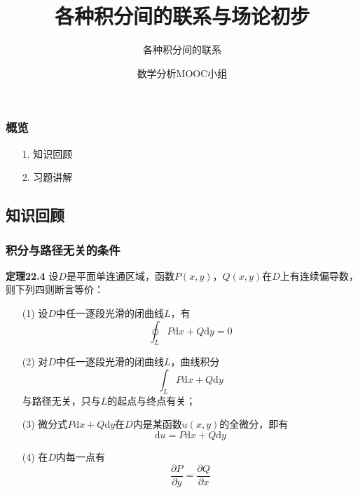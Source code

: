 \documentclass[xetex]{beamer}
\begin{document}
	\begin{frame}
		\title{各种积分间的联系与场论初步}
		\subtitle{各种积分间的联系}
		\author{数学分析MOOC小组}
		\date{  }
		\titlepage
	\end{frame}
	
	\begin{frame}
		\frametitle{概览}
		\begin{itemize}
			\item[1.] 知识回顾		
			\item[2.] 习题讲解
		\end{itemize}
	\end{frame}
	
	\begin{frame}
		\section{知识回顾}
	\end{frame}
	
	\begin{frame}
		\frametitle{积分与路径无关的条件}
		\textbf{定理22.4}
			设$D$是平面单连通区域，函数$P(x, y)$，$Q(x, y)$在$D$上有连续偏导数，则下列四则断言等价：
			\begin{itemize}
				\item[(1)] 设$D$中任一逐段光滑的闭曲线$L$，有
					\begin{equation*}
						\oint_L P\mathrm{d}x + Q\mathrm{d}y = 0
					\end{equation*}
				\item[(2)]对$D$中任一逐段光滑的闭曲线$L$，曲线积分
					\begin{equation*}
						\int_L P\mathrm{d}x + Q\mathrm{d}y
					\end{equation*}
					与路径无关，只与$L$的起点与终点有关；
				\item[(3)]微分式$P\mathrm{d}x + Q\mathrm{d}y$在$D$内是某函数$u(x, y)$的全微分，即有
					\begin{equation*}
						\mathrm{d}u = P\mathrm{d}x + Q\mathrm{d}y
					\end{equation*}
				\item[(4)] 在$D$内每一点有
					\begin{equation*}
						\frac{\partial P}{\partial y} = \frac{\partial Q}{\partial x}
					\end{equation*}
			\end{itemize}
	\end{frame}
	
\end{document}

